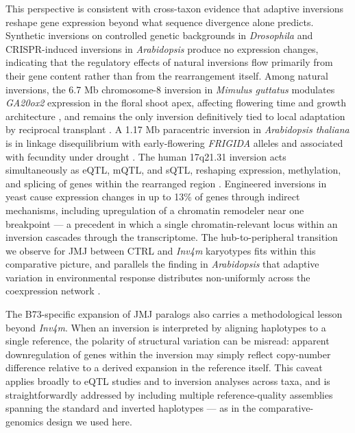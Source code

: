 \documentclass[9pt,twocolumn,twoside]{rilabRxiv}
\newcommand{\invfour}{\textit{Inv4m}\xspace}
\begin{document}
This perspective is consistent with cross-taxon evidence that adaptive inversions reshape gene expression beyond what sequence divergence alone predicts.
Synthetic inversions on controlled genetic backgrounds in \textit{Drosophila} \citep{said2018} and CRISPR-induced inversions in \textit{Arabidopsis} \citep{khosravi2025} produce no expression changes, indicating that the regulatory effects of natural inversions flow primarily from their gene content rather than from the rearrangement itself.
Among natural inversions, the 6.7 Mb chromosome-8 inversion in \textit{Mimulus guttatus} modulates \textit{GA20ox2} expression in the floral shoot apex, affecting flowering time and growth architecture \citep{kollar2025}, and remains the only inversion definitively tied to local adaptation by reciprocal transplant \citep{lowry2010}.
A 1.17 Mb paracentric inversion in \textit{Arabidopsis thaliana} is in linkage disequilibrium with early-flowering \textit{FRIGIDA} alleles and associated with fecundity under drought \citep{fransz2016}.
The human 17q21.31 inversion acts simultaneously as eQTL, mQTL, and sQTL, reshaping expression, methylation, and splicing of genes within the rearranged region \citep{wang2023inversions}.
Engineered inversions in yeast cause expression changes in up to 13\% of genes through indirect mechanisms, including upregulation of a chromatin remodeler near one breakpoint \citep{naseeb2016} --- a precedent in which a single chromatin-relevant locus within an inversion cascades through the transcriptome.
The hub-to-peripheral transition we observe for JMJ between CTRL and \invfour karyotypes fits within this comparative picture, and parallels the finding in \textit{Arabidopsis} that adaptive variation in environmental response distributes non-uniformly across the coexpression network \citep{desmarais2017}.
 
The B73-specific expansion of JMJ paralogs also carries a methodological lesson beyond \invfour.
When an inversion is interpreted by aligning haplotypes to a single reference, the polarity of structural variation can be misread: apparent downregulation of genes within the inversion may simply reflect copy-number difference relative to a derived expansion in the reference itself.
This caveat applies broadly to eQTL studies and to inversion analyses across taxa, and is straightforwardly addressed by including multiple reference-quality assemblies spanning the standard and inverted haplotypes --- as in the comparative-genomics design we used here.
\end{document}
